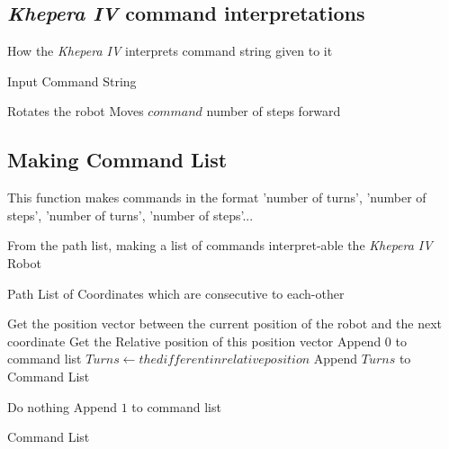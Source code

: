 \subsection{\textit{Khepera IV} command interpretations}
\label{function:command_interpretation}
\begin{algorithm}
\caption{How the \textit{Khepera IV} interprets command string given to it}
\begin{algorithmic}


\REQUIRE Input Command String

        \STATE Rotates the robot 
        \STATE Moves $command$ number of steps forward
\ENDIF
\ENDFOR{}


\end{algorithmic}
\end{algorithm}




\subsection{Making Command List}

This function makes commands in the format 'number of turns', 'number of steps', 'number of turns', 'number of steps'...

\label{function:make_command_list}
\begin{algorithm}
\caption{From the path list, making a list of commands interpret-able the \textit{Khepera IV} Robot}
\begin{algorithmic}
\REQUIRE Path List of Coordinates which are consecutive to each-other

    \STATE Get the position vector between the current position of the robot and the next coordinate
    \STATE Get the Relative position of this position vector
        \STATE Append $0$ to command list
        \STATE $Turns \leftarrow the different in relative position$
        \STATE Append $Turns$ to Command List 
    
    
        \STATE Do nothing
        \STATE Append $1$ to command list
    
    
\ENDIF
\ENDFOR

\RETURN Command List


\end{algorithmic}
\end{algorithm}


